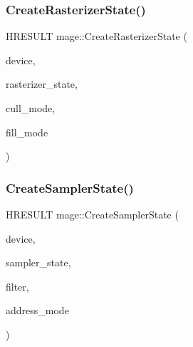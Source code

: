 \hypertarget{namespacemage_a801f8c5a484129ae6717733de626b625}{}\label{namespacemage_a801f8c5a484129ae6717733de626b625} 
\subsubsection{\texorpdfstring{Create\+Rasterizer\+State()}{CreateRasterizerState()}}
{\footnotesize\ttfamily H\+R\+E\+S\+U\+LT mage\+::\+Create\+Rasterizer\+State (\begin{DoxyParamCaption}\item[{I\+D3\+D11\+Device2 $\ast$}]{device,  }\item[{I\+D3\+D11\+Rasterizer\+State $\ast$$\ast$}]{rasterizer\+\_\+state,  }\item[{D3\+D11\+\_\+\+C\+U\+L\+L\+\_\+\+M\+O\+DE}]{cull\+\_\+mode,  }\item[{D3\+D11\+\_\+\+F\+I\+L\+L\+\_\+\+M\+O\+DE}]{fill\+\_\+mode }\end{DoxyParamCaption})}

\hypertarget{namespacemage_aba8cfdff9edf018ab6ebe2f3f72a2095}{}\label{namespacemage_aba8cfdff9edf018ab6ebe2f3f72a2095} 
\subsubsection{\texorpdfstring{Create\+Sampler\+State()}{CreateSamplerState()}}
{\footnotesize\ttfamily H\+R\+E\+S\+U\+LT mage\+::\+Create\+Sampler\+State (\begin{DoxyParamCaption}\item[{I\+D3\+D11\+Device2 $\ast$}]{device,  }\item[{I\+D3\+D11\+Sampler\+State $\ast$$\ast$}]{sampler\+\_\+state,  }\item[{D3\+D11\+\_\+\+F\+I\+L\+T\+ER}]{filter,  }\item[{D3\+D11\+\_\+\+T\+E\+X\+T\+U\+R\+E\+\_\+\+A\+D\+D\+R\+E\+S\+S\+\_\+\+M\+O\+DE}]{address\+\_\+mode }\end{DoxyParamCaption})}

\hypertarget{namespacemage_a3119898d7caac71d8ee495c3ae3194b1}{}\label{namespacemage_a3119898d7caac71d8ee495c3ae3194b1} 
